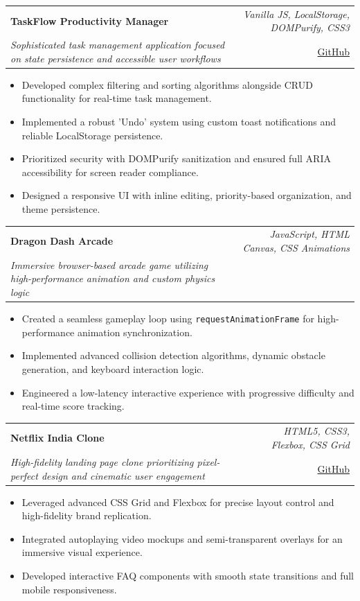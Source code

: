 \documentclass[a4paper,11pt]{article}
\makeatletter
\newcommand{\resumeProject}[4]{
\vspace{0.5mm}\item
    \begin{tabular*}{0.98\textwidth}[t]{l@{\extracolsep{\fill}}r}
        \textbf{#1} & \textit{\footnotesize{#3}} \\
        \footnotesize{\textit{#2}} & \footnotesize{#4}
    \end{tabular*}
    \vspace{-2.4mm}
}
\newcommand{\resumeItemListStart}{\begin{justify}\begin{itemize}[leftmargin=3ex, rightmargin=2ex, noitemsep,labelsep=1.2mm,itemsep=0mm]\small}
\newcommand{\resumeItemListEnd}{\end{itemize}\end{justify}\vspace{-2mm}}
\makeatother
\begin{document}
  \resumeProject
    {TaskFlow Productivity Manager}
    {Sophisticated task management application focused on state persistence and accessible user workflows}
    {Vanilla JS, LocalStorage, DOMPurify, CSS3}
    {\href{https://github.com/Rohith-180503/TODO-LIST-APP}{GitHub}}
    \resumeItemListStart
      \item Developed complex filtering and sorting algorithms alongside CRUD functionality for real-time task management.
      \item Implemented a robust 'Undo' system using custom toast notifications and reliable LocalStorage persistence.
      \item Prioritized security with DOMPurify sanitization and ensured full ARIA accessibility for screen reader compliance.
      \item Designed a responsive UI with inline editing, priority-based organization, and theme persistence.
    \resumeItemListEnd
    \vspace{-2mm}

  \resumeProject
    {Dragon Dash Arcade}
    {Immersive browser-based arcade game utilizing high-performance animation and custom physics logic}
    {JavaScript, HTML Canvas, CSS Animations}
    {}
    \resumeItemListStart
      \item Created a seamless gameplay loop using \texttt{requestAnimationFrame} for high-performance animation synchronization.
      \item Implemented advanced collision detection algorithms, dynamic obstacle generation, and keyboard interaction logic.
      \item Engineered a low-latency interactive experience with progressive difficulty and real-time score tracking.
    \resumeItemListEnd
    \vspace{-2mm}

  \resumeProject
    {Netflix India Clone}
    {High-fidelity landing page clone prioritizing pixel-perfect design and cinematic user engagement}
    {HTML5, CSS3, Flexbox, CSS Grid}
    {\href{https://github.com/Rohith-180503/NETFLIX-CLONE}{GitHub}}
    \resumeItemListStart
      \item Leveraged advanced CSS Grid and Flexbox for precise layout control and high-fidelity brand replication.
      \item Integrated autoplaying video mockups and semi-transparent overlays for an immersive visual experience.
      \item Developed interactive FAQ components with smooth state transitions and full mobile responsiveness.
    \resumeItemListEnd
\end{document}
